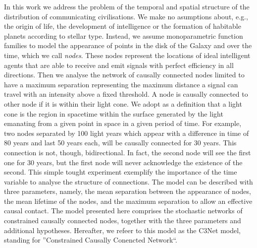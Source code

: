 \documentclass[crop]{CSLB}
\begin{document}
In this work we address the problem of the temporal and spatial structure of
the distribution of communicating civilisations.
%
We make no asumptions about, e.g., the origin of life, the development of
intelligence or the formation of habitable planets according to stellar type.
%
Instead, we assume monoparametric function families to model the appearance of
points in the disk of the Galaxy and over the time, which we call
\textit{nodes}.
%
These nodes represent the locations of ideal intelligent agents that are able
to receive and emit signals with perfect efficiency in all directions.
%
Then we analyse the network of causally connected nodes limited to have a
maximum separation representing the maximum distance a signal can travel with
an intensity above a fixed threshold.
%
A node is causally connected to other node if it is within their light cone.
%
We adopt as a definition that a light cone is the region in spacetime within
the surface generated by the light emanating from a given point in space in a
given period of time.
%
For example, two nodes separated by 100 light years which appear with a
difference in time of 80 years and last 50 years each, will be causally
connected for 30 years.
%
This connection is not, though, bidirectional.
%
In fact, the second node will see the first one for 30 years, but the first
node will never acknowledge the existence of the second.
%
This simple tought experiment exemplify the importance of the time variable to
analyse the structure of connections.
%
The model can be described with three parameters, namely, the mean separation
between the appearance of nodes, the mean lifetime of the nodes, and the
maximum separation to allow an effective causal contact.
%
The model presented here comprises the stochastic networks of constrained
causally connected nodes, together with the three parameters and additional
hypotheses.
%
Hereafter, we refeer to this model as the C3Net model, standing for
''Constrained Causally Conencted Network``.
\end{document}

